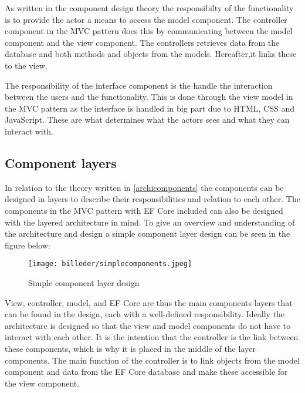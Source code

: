 As written in the component design theory the responsibilty of the functionality is to provide the actor a means to access the model component.
The controller component in the MVC pattern does this by communicating between the model component and the view component.
The controllers retrieves data from the database and both methods and objects from the models.
Hereafter,it links these to the view.

The responsibility of the interface component is the handle the interaction between the users and the functionality.
This is done through the view model in the MVC pattern as the interface is handled in big part due to HTML, CSS and JavaScript.
These are what determines what the actors sees and what they can interact with.

\subsection{Component layers}
In relation to the theory written in \cref{archicomponents} the components can be designed in layers to describe their responsibilities and relation to each other.
The components in the MVC pattern with EF Core included can also be designed with the layered architecture in mind.
To give an overview and understanding of the architecture and design a simple component layer design can be seen in the figure below:

\begin{figure}[H]
	\centering
	\texttt{[image: billeder/simplecomponents.jpeg]}
	\caption{Simple component layer design}\label{fig:SimpleComponent}
\end{figure}

View, controller, model, and EF Core are thus the main components layers that can be found in the design, each with a well-defined responsibility.
Ideally the architecture is designed so that the view and model components do not have to interact with each other.
It is the intention that the controller is the link between these components, which is why it is placed in the middle of the layer components.
The main function of the controller is to link objects from the model component and data from the EF Core database and make these accessible for the view component.

